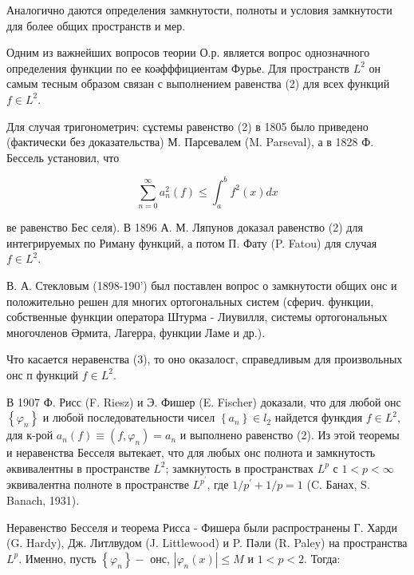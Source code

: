 \documentclass[10pt]{article}
\begin{document}
Аналогично даются определения замкнутости, полноты и условия замкнутости для более общих пространств и мер.



Одним из важнейших вопросов теории О.р. является вопрос однозначного определения функции по ее коәфффициентам Фурье. Для пространств $L^{2}$ он самым тесным образом связан с выполнением равенства (2) для всех функций $f \in L^{2}$.



Для случая тригонометрич: сұстемы равенство (2) в 1805 было приведено (фактически без доказательства) М. Парсевалем (M. Parseval), а в 1828 Ф. Бессель установил, что



\[

\sum_{n=0}^{\infty} a_{n}^{2}(f) \leqslant \int_{a}^{b} f^{2}(x) d x

\]



ве равенство Бес селя). В 1896 А. М. Ляпунов доказал равенство (2) для интегрируемых по Риману функций, а потом П. Фату (P. Fatou) для случая $f \in L^{2}$.



В. А. Стекловым (1898-190') был поставлен вопрос о замкнутости общих онс и положительно решен для многих ортогональных систем (сферич. функции, собственные функции оператора Штурма - Лиувилля, системы ортогональных многочленов Әрмита, Лагерра, функции Ламе и др.).



Что касается неравенства (3), то оно оказалосг, справедливым для произвольных онс п функций $f \in L^{2}$.



В 1907 Ф. Рисс (F. Riesz) и Э. Фишер (E. Fischer) доказали, что для любой онс $\left\{\varphi_{n}\right\}$ и любой последовательности чисел $\left\{a_{n}\right\} \in l_{2}$ найдется функдия $f \in L^{2}$, для к-рой $a_{n}(f) \equiv\left(f, \varphi_{n}\right)=a_{n}$ и выполнено равенство (2). Из этой теоремы и неравенства Бесселя вытекает, что для любых онс полнота и замкнутость әквивалентны в пространстве $L^{2}$; замкнутость в пространствах $L^{p}$ с $1<p<\infty$ эквивалентна полноте в пространстве $L^{p^{\prime}}$, где $1 / p^{\prime}+1 / p=1$ (C. Банах, S. Banach, 1931).



Неравенство Бесселя и теорема Рисса - Фишера были распространены Г. Харди (G. Hardy), Дж. Литлвудом (J. Littlewood) и P. Пәли (R. Paley) на пространства $L^{p}$. Именно, пусть $\left\{\varphi_{n}\right\}-$ онс, $\left|\varphi_{n}(x)\right| \leqslant M$ и $1<p<2$. Тогда:
\end{document}
